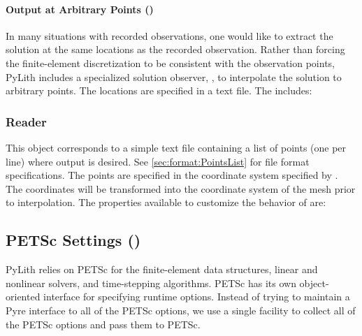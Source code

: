 \paragraph{Output at Arbitrary Points (\protect{})}
\label{sec:output:points}

In many situations with recorded observations, one would like to
extract the solution at the same locations as the recorded
observation. Rather than forcing the finite-element discretization to
be consistent with the observation points, PyLith includes a
specialized solution observer, , to interpolate
the solution to arbitrary points. The locations
are specified in a text file. The 
includes:
\begin{inventory}
\end{inventory}

\subsubsection{ Reader}

This object corresponds to a simple text file containing a list of
points (one per line) where output is desired. See \vref{sec:format:PointsList}
for file format specifications. The points are specified in the coordinate
system specified by . The coordinates will be transformed
into the coordinate system of the mesh prior to interpolation. The
properties available to customize the behavior of 
are:
\begin{inventory}
\end{inventory}



\subsection{PETSc Settings (\protect{})}
\label{sec:petsc:options}

PyLith relies on PETSc for the finite-element data structures, linear
and nonlinear solvers, and time-stepping algorithms. PETSc has its own
object-oriented interface for specifying runtime options. Instead of
trying to maintain a Pyre interface to all of the PETSc options, we
use a single  facility to collect all of the PETSc
options and pass them to PETSc.

